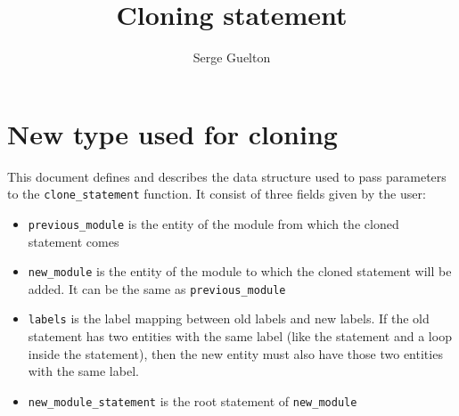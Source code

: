 \documentclass[a4paper]{article}
\title{Cloning statement}
\author{Serge Guelton}
\begin{document}
\maketitle
\sloppy

\section*{New type used for cloning}

This document defines and describes the data structure used to pass parameters to the \lstinline|clone_statement| function.
It consist of three fields given by the user:
\begin{itemize}
\item \lstinline|previous_module| is the entity of the module from which the cloned statement comes
\item \lstinline|new_module| is the entity of the module to which the cloned statement will be added. It can be the same as \lstinline|previous_module|
\item \lstinline|labels| is the label mapping between old labels and new labels. If the old statement has two entities with the same label (like the statement and a loop inside the statement), then the new entity must also have those two entities with the same label.
\item \lstinline|new_module_statement| is the root statement of \lstinline|new_module|
\end{itemize}

{}
{}

\end{document}
